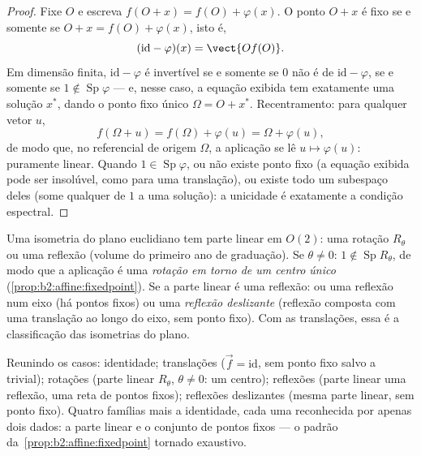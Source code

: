 \begin{proof}
Fixe $O$ e escreva $f(O + x) = f(O) + \varphi(x)$. O ponto
$O + x$ é fixo se e somente se $O + x = f(O) + \varphi(x)$, isto é,
\[
(\mathrm{id} - \varphi)(x) = \vect{O f(O)} .
\]
Em dimensão finita, $\mathrm{id} - \varphi$ é invertível
se e somente se $0$ não é  de $\mathrm{id} - \varphi$, se e somente se
$1 \notin \operatorname{Sp}\varphi$ --- e, nesse caso, a
equação exibida tem exatamente uma solução $x^*$, dando o
ponto fixo único $\Omega = O + x^*$. Recentramento: para qualquer
vetor $u$,
\[
f(\Omega + u) = f(\Omega) + \varphi(u) = \Omega + \varphi(u),
\]
de modo que, no referencial de origem $\Omega$, a aplicação se lê $u \mapsto
\varphi(u)$: puramente linear. Quando $1 \in
\operatorname{Sp}\varphi$, ou não existe ponto fixo (a
equação exibida pode ser insolúvel, como para uma translação),
ou existe todo um subespaço  deles (some qualquer 
de  $1$ a uma solução): a unicidade é exatamente a
condição espectral.
\end{proof}

\begin{example}\label{ex:b2:affine:isometries}
Uma isometria  do plano euclidiano tem parte linear em
$O(2)$: uma rotação $R_\theta$ ou uma reflexão (volume do primeiro ano de graduação). Se
$\theta \neq 0$: $1 \notin \operatorname{Sp} R_\theta$, de modo que a aplicação
é uma \emph{rotação em torno de um centro único}
(\cref{prop:b2:affine:fixedpoint}). Se a parte linear é uma
reflexão: ou uma reflexão num eixo (há pontos fixos) ou
uma \emph{reflexão deslizante} (reflexão composta com uma translação
ao longo do eixo, sem ponto fixo). Com as translações, essa é a
classificação  das isometrias do plano.
\end{example}

\begin{remark}
Reunindo os casos: identidade; translações ($\vec f =
\mathrm{id}$, sem ponto fixo salvo a trivial); rotações
(parte linear $R_\theta$, $\theta \neq 0$: um centro);
reflexões (parte linear uma reflexão, uma reta de pontos
fixos); reflexões deslizantes (mesma parte linear, sem ponto
fixo). Quatro famílias mais a identidade, cada uma reconhecida por
apenas dois dados: a parte linear e o conjunto de pontos fixos ---
o padrão da~\cref{prop:b2:affine:fixedpoint} tornado
exaustivo.
\end{remark}

